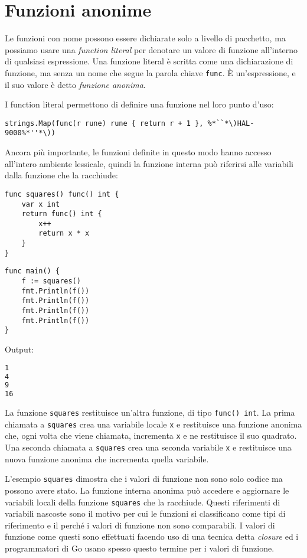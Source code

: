 \section{Funzioni anonime}
\label{sec:funzioni_anonime}%
Le funzioni con nome possono essere dichiarate solo a livello di pacchetto, ma possiamo usare una \textit{function literal} per denotare un valore di funzione all'interno di qualsiasi espressione.
Una funzione literal è scritta come una dichiarazione di funzione, ma senza un nome che segue la parola chiave \verb|func|.
È un'espressione, e il suo valore è detto \textit{funzione anonima}.

I function literal permettono di definire una funzione nel loro punto d'uso:
\begin{lstlisting}[frame=single, label={lst:lstlisting4-6.1}]
strings.Map(func(r rune) rune { return r + 1 }, %*``*\)HAL-9000%*''*\))
\end{lstlisting}
Ancora più importante, le funzioni definite in questo modo hanno accesso all'intero ambiente lessicale, quindi la funzione interna può riferirsi alle variabili dalla funzione che la racchiude:
\begin{lstlisting}[frame=single, label={lst:lstlisting4-6.2}]
func squares() func() int {
    var x int
    return func() int {
        x++
        return x * x
    }
}
\end{lstlisting}
\begin{lstlisting}[frame=single, label={lst:lstlisting4-6.3}]
func main() {
    f := squares()
    fmt.Println(f())
    fmt.Println(f())
    fmt.Println(f())
    fmt.Println(f())
}
\end{lstlisting}
Output:
\begin{lstlisting}[language=bash, frame=L, label={lst:lstlisting4-6.4}]
1
4
9
16
\end{lstlisting}
La funzione \verb|squares| restituisce un'altra funzione, di tipo \verb|func() int|.
La prima chiamata a \verb|squares| crea una variabile locale \verb|x| e restituisce una funzione anonima che, ogni volta che viene chiamata, incrementa \verb|x| e ne restituisce il suo quadrato.
Una seconda chiamata a \verb|squares| crea una seconda variabile \verb|x| e restituisce una nuova funzione anonima che incrementa quella variabile.

L'esempio \verb|squares| dimostra che i valori di funzione non sono solo codice ma possono avere stato.
La funzione interna anonima può accedere e aggiornare le variabili locali della funzione \verb|squares| che la racchiude.
Questi riferimenti di variabili nascoste sono il motivo per cui le funzioni si classificano come tipi di riferimento e il perché i valori di funzione non sono comparabili.
I valori di funzione come questi sono effettuati facendo uso di una tecnica detta \textit{closure} ed i programmatori di Go usano spesso questo termine per i valori di funzione.

